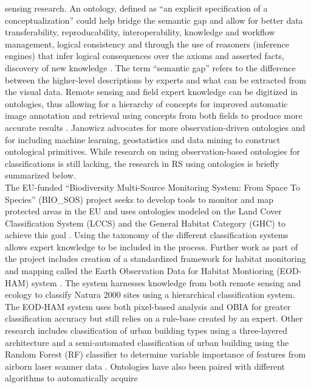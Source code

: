 \documentclass[authoryear, review,12pt,number]{elsarticle}
\begin{document}
sensing research. An ontology, defined  as ``an explicit specification of a
conceptualization'' \citep{gruber1993} could help bridge the semantic gap and
allow for better data transferability, reproducability, interoperability,
knowledge and workflow management, logical consistency and through the use of
reasoners (inference engines) that infer logical consequences over the axioms
and asserted facts, discovery of new knowledge \citep{Arvor2013, Andres2013a}.
The term ``semantic gap'' refers to the difference between the higher-level
descriptions by experts and what can be extracted from the visual data. Remote
sensing and field expert knowledge can be digitized in ontologies, thus
allowing for a hierarchy of concepts for improved automatic image annotation
and retrieval using concepts from both fields to produce more accurate results
\cite{Srikanth:2005:EOA:1076034.1076128}. Janowicz \cite{Janowicz2012}
advocates for more observation-driven ontologies and for including machine
learning, geostatistics and data mining to construct ontological primitives.
While research on using observation-based ontologies for classifications is
still lacking, the research in RS using ontologies is briefly summarized below.
\\
The EU-funded  ``Biodiversity Multi-Source Monitoring System: From Space To
Species'' (BIO\_SOS) project seeks to develop tools to monitor and map protected
areas in the EU and uses ontologies modeled on the Land Cover Classification
System (LCCS) and the General Habitat Category (GHC) to achieve this goal
\citep{Arvor2013}.  Using the taxonomy of the different classification systems
allows expert knowledge to be included in the process. Further work as part of
the project includes creation of a standardized
framework for habitat monitoring and mapping called the Earth Observation Data
for Habitat Montioring (EOD-HAM) system \citep{Lucas2015}. The system harnesses
knowledge from both remote sensing and ecology to classify Natura 2000 sites
using a hierarchical classification system. The EOD-HAM system uses both
pixel-based analysis and OBIA for greater classification accuracy but still
relies on a rule-base created by an expert. Other research includes
classification of urban building types using a three-layered architecture
\citep{diSciascio2013} and a semi-automated classification of urban building
using the Random Forest (RF) classifier to determine variable importance of
features from airborn laser scanner data \citep{Belgiu2014}. Ontologies have
also been paired with different algorithms to automatically acquire
\end{document}
